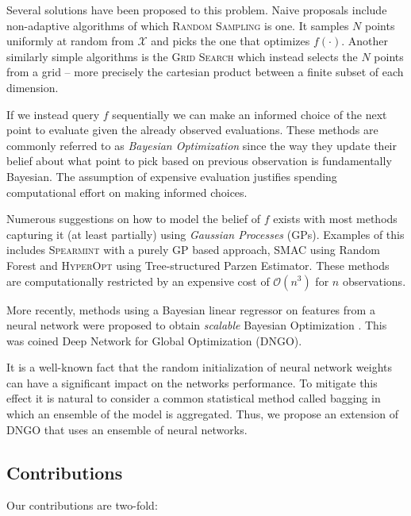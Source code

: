 \documentclass[conference,compsoc]{IEEEtran}
\theoremstyle{definition}
\begin{document}
    Several solutions have been proposed to this problem.
    Naive proposals include non-adaptive algorithms of which \textsc{Random Sampling} is one.
    It samples $N$ points uniformly at random from $\mathcal{X}$ and picks the one that optimizes $f(\cdot)$.
    Another similarly simple algorithms is the \textsc{Grid Search} which instead selects the $N$ points from a grid -- more precisely the cartesian product between a finite subset of each dimension.

    If we instead query $f$ sequentially we can make an informed choice of the next point to evaluate given the already observed evaluations.
    These methods are commonly referred to as \emph{Bayesian Optimization} since the way they update their belief about what point to pick based on previous observation is fundamentally Bayesian.
    The assumption of expensive evaluation justifies spending computational effort on making informed choices.

    Numerous suggestions on how to model the belief of $f$ exists with most methods capturing it (at least partially) using \emph{Gaussian Processes} (GPs).
    Examples of this includes \textsc{Spearmint} \parencite{snoek_practical_2012} with a purely GP based approach, \textsc{SMAC} \parencite{hutter_sequential_2011} using Random Forest and \textsc{HyperOpt} \parencite{bergstra_algorithms_2011} using Tree-structured Parzen Estimator.
    These methods are computationally restricted by an expensive cost of $\mathcal{O}(n^3)$ for $n$ observations.
    
    More recently, methods using a Bayesian linear regressor on features from a neural network were proposed to obtain \emph{scalable} Bayesian Optimization \parencite{snoek_scalable_2015}.
    This was coined Deep Network for Global Optimization (DNGO).
    
    It is a well-known fact that the random initialization of neural network weights can have a significant impact on the networks performance.
    To mitigate this effect it is natural to consider a common statistical method called bagging in which an ensemble of the model is aggregated.
    Thus, we propose an extension of DNGO that uses an ensemble of neural networks.

    \subsection{Contributions}
        
        Our contributions are two-fold:
\end{document}
